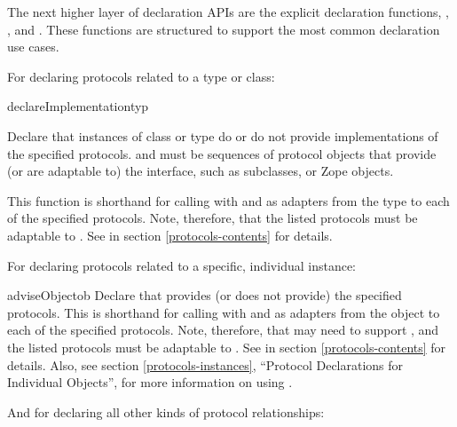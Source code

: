 \begin{verbatim%
}
\begin{verbatim%
}
\begin{verbatim%
}
\begin{verbatim%
}
The next higher layer of declaration APIs are the explicit declaration
functions, , , and
.  These functions are structured to support the most
common declaration use cases.

For declaring protocols related to a type or class:

\begin{funcdesc}{declareImplementation}{typ
 }

Declare that instances of class or type  do or do not provide
implementations of the specified protocols.   and
 must be sequences of protocol objects that
provide (or are adaptable to) the  interface,
such as  subclasses, or Zope 
objects.

This function is shorthand for calling 
with  and  as adapters
from the type to each of the specified protocols.  Note, therefore, that the
listed protocols must be adaptable to .  See
 in section \ref{protocols-contents} for
details.
\end{funcdesc}


For declaring protocols related to a specific, individual instance:

\begin{funcdesc}{adviseObject}{ob
 }
Declare that  provides (or does not provide) the specified protocols.
This is shorthand for calling 
with  and  as adapters
from the object to each of the specified protocols.  Note, therefore, that
 may need to support , and the listed protocols
must be adaptable to .  See
 in section \ref{protocols-contents} for
details.  Also, see section \ref{protocols-instances}, ``Protocol Declarations
for Individual Objects'', for more information on using
.
\end{funcdesc}





And for declaring all other kinds of protocol relationships:


\end{verbatim%
}
\end{verbatim%
}
\end{verbatim%
}
\end{verbatim%
}

